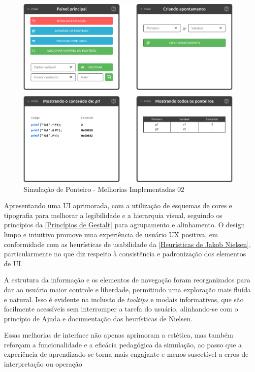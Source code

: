 \begin{figure}[htb]
    \begin{center}
        \includegraphics[scale=0.25]{figs/debugandoED-ponteiro-depois-02.png}
    \end{center}
    \caption{\label{debugandoED-ponteiro-depois-02}Simulação de Ponteiro - Melhorias Implementadas 02}
\end{figure}

Apresentando uma \ac{UI} aprimorada, com a utilização de esquemas de cores e tipografia para melhorar a legibilidade e a hierarquia visual, seguindo os princípios da \autoref{Princípios de Gestalt} para agrupamento e alinhamento. O design limpo e intuitivo promove uma experiência de usuário \ac{UX} positiva, em conformidade com as heurísticas de usabilidade da \autoref{Heurísticas de Jakob Nielsen}, particularmente no que diz respeito à consistência e padronização dos elementos de \ac{UI}.

A estrutura da informação e os elementos de navegação foram reorganizados para dar ao usuário maior controle e liberdade, permitindo uma exploração mais fluída e natural. Isso é evidente na inclusão de \textit{tooltips} e modais informativos, que são facilmente acessíveis sem interromper a tarefa do usuário, alinhando-se com o princípio de Ajuda e documentação das heurísticas de Nielsen.

Essas melhorias de interface não apenas aprimoram a estética, mas também reforçam a funcionalidade e a eficácia pedagógica da simulação, ao passo que a experiência de aprendizado se torna mais engajante e menos suscetível a erros de interpretação ou operação


